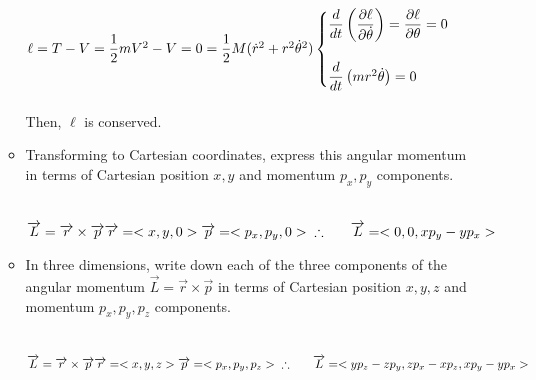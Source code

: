 \documentclass[fleqn]{article}
\begin{document}
\begin{enumerate}
\begin{itemize}
        \textcolor{hwColor}{
          $
            \ell=T-V=\dfrac{1}{2} mV^2-V=0
            \\
            \\
            =\dfrac{1}{2} M (\dot{r}^2+r^2 \dot{\theta}^2)
            \\
            \\
            \begin{cases}
              \dfrac{d}{dt} \left(\dfrac{\partial \ell}{\partial \dot{\theta}}\right)=\dfrac{\partial \ell}{\partial \theta}=0
              \\
              \\
              \dfrac{d}{dt} \left(mr^2 \dot{\theta}\right)=0
            \end{cases}
          $
          \\
          \\
          Then, $\ell$ is conserved. 
        }

      \item Transforming to Cartesian coordinates, express this angular momentum in terms of Cartesian position
      $x, y$ and momentum $p_x, p_y$ components.

        \textcolor{hwColor}{
          \\
          $
            \overrightarrow{L}=\overrightarrow{r} \times \overrightarrow{p}
            \\
            \\
            \overrightarrow{r}=<x, y, 0>
            \\
            \\
            \overrightarrow{p}=<p_x, p_y, 0>
            \\
            \\
            \\
            \therefore ~~~~~ \overrightarrow{L}=<0, 0, x p_y-y p_x>
          $
        }

      \item In three dimensions, write down each of the three components of
      the angular momentum $\overrightarrow{L}=\overrightarrow{r} \times \overrightarrow{p}$ in terms of Cartesian position
      $x,y,z$ and momentum $p_x, p_y, p_z$ components.

        \textcolor{hwColor}{
          \\
          $
            \overrightarrow{L}=\overrightarrow{r} \times \overrightarrow{p}
            \\
            \\
            \overrightarrow{r}=<x, y, z>
            \\
            \\
            \overrightarrow{p}=<p_x, p_y, p_z>
            \\
            \\
            \\
            \therefore ~~~~~ \overrightarrow{L}=<y p_z-z p_y, z p_x-x p_z, x p_y-y p_x>
          $
        }


\end{itemize}
\end{enumerate}
\end{document}
